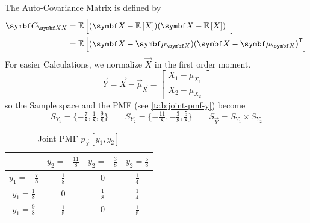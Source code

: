 The Auto-Covariance Matrix is defined by
\begin{align}
    \mat{C}_{\vec{XX}}
    &= \E{(\vec{X} - \E{X}){(\vec{X} - \E{X})}^{\T}} \notag \\
    &= \E{(\vec{X} - \vec{\mu}_{\vec{X}}){(\vec{X} - \vec{\mu}_{\vec{X}})}^{\T}} \label{eq:auto-cov-mtx}
\end{align}
For easier Calculations, we normalize $\vec{X}$ in the first order moment.
\[
\vec{Y} = \vec{X} - \vec{\mu}_{\vec{X}} = \begin{bmatrix}
    X_1 - \mu_{X_1} \\
    X_2 - \mu_{X_2}
\end{bmatrix}
\]
so the Sample space and the PMF (see \autoref{tab:joint-pmf-y}) become
\[
    S_{Y_1} = \{-\tfrac{7}{8}, \tfrac{1}{8}, \tfrac{9}{8}\} \qquad S_{Y_2} = \{-\tfrac{11}{8}, -\tfrac{3}{8}, \tfrac{5}{8}\} \qquad S_{\vec{Y}} = S_{Y_1} \times S_{Y_2}
\]
\begin{table}[h]
    \centering
    \caption{Joint PMF $p_{\vec{Y}}[y_1, y_2]$}\label{tab:joint-pmf-y}
    \begin{tabular}{c|ccc}
        & $y_2 = -\tfrac{11}{8}$ & $y_2=-\tfrac{3}{8}$ & $y_2=\tfrac{5}{8}$ \\ \hline
        $y_1=-\tfrac{7}{8}$ & $\frac{1}{8}$ & $0$ & $\frac{1}{4}$ \\
        $y_1=\tfrac{1}{8}$ & $0$ & $\frac{1}{8}$ & $\frac{1}{4}$ \\
        $y_1=\tfrac{9}{8}$ & $\frac{1}{8}$ & $0$ & $\frac{1}{8}$
    \end{tabular}
\end{table}

